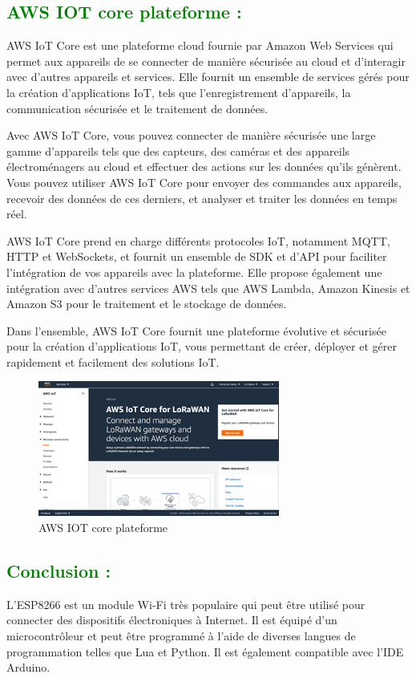 \begin{flushleft}
	\subsection{\textcolor{green}{AWS IOT core plateforme :}}
	
	AWS IoT Core est une plateforme cloud fournie par Amazon Web Services qui permet aux appareils de se connecter de manière sécurisée au cloud et d'interagir avec d'autres appareils et services. Elle fournit un ensemble de services gérés pour la création d'applications IoT, tels que l'enregistrement d'appareils, la communication sécurisée et le traitement de données.\newline
	
	Avec AWS IoT Core, vous pouvez connecter de manière sécurisée une large gamme d'appareils tels que des capteurs, des caméras et des appareils électroménagers au cloud et effectuer des actions sur les données qu'ils génèrent. Vous pouvez utiliser AWS IoT Core pour envoyer des commandes aux appareils, recevoir des données de ces derniers, et analyser et traiter les données en temps réel.\newline
	
	AWS IoT Core prend en charge différents protocoles IoT, notamment MQTT, HTTP et WebSockets, et fournit un ensemble de SDK et d'API pour faciliter l'intégration de vos appareils avec la plateforme. Elle propose également une intégration avec d'autres services AWS tels que AWS Lambda, Amazon Kinesis et Amazon S3 pour le traitement et le stockage de données.\newline
	
	Dans l'ensemble, AWS IoT Core fournit une plateforme évolutive et sécurisée pour la création d'applications IoT, vous permettant de créer, déployer et gérer rapidement et facilement des solutions IoT.
	\begin{figure}[h]
		\centering
		\includegraphics{chapitres/images/aws.PNG}
		\caption{AWS IOT core plateforme}
		\label{fig:labelname}
	\end{figure}
	\subsection{\textcolor{green}{Conclusion :}}
	L'ESP8266 est un module Wi-Fi très populaire qui peut être utilisé pour connecter des dispositifs électroniques à Internet. Il est équipé d'un microcontrôleur et peut être programmé à l'aide de diverses langues de programmation telles que Lua et Python. Il est également compatible avec l'IDE Arduino.\newline
	

\end{flushleft}

